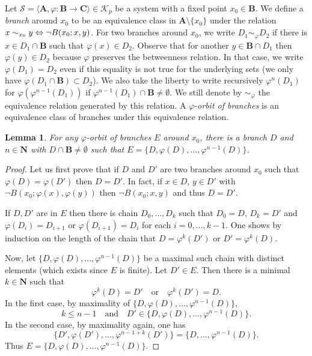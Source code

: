 \documentclass[JEP,XML,SOM,Unicode,NoFloatCountersInSection]{cedram}
\newcommand\ssi{\mathchoice{\iff}{\Leftrightarrow}{\Leftrightarrow}{\Leftrightarrow}}
\let\mathcal\mathscr
\theoremstyle{plain}
\newtheorem{lem}[thm]{Lemma}
\theoremstyle{definition}
\newcommand{\bA}{{\boldsymbol{A}}}
\newcommand{\bB}{{\boldsymbol{B}}}
\newcommand{\bC}{{\boldsymbol{C}}}
\newcommand{\NN}{\mathbf{N}}
\newcommand{\cK}{\mathcal{K}}
\newcommand{\cS}{\mathcal{S}}
\begin{document}
Let $\cS=\langle \bA,\varphi\colon\bB\to\bC\rangle\in\cK_p$ be a system with a fixed point $x_0\in\bB$. We define a \emph{branch} around $x_0$ to be an equivalence class in $\bA\setminus\{x_0\}$ under the relation $x\sim_{x_0} y \ssi \neg B(x_0;x,y)$.
For two branches around $x_0$, we write $D_1\sim_\varphi D_2$ if there is $x\in D_1\cap \bB$ such that $\varphi(x)\in D_2$. Observe that for another $y\in \bB\cap D_1$ then $\varphi(y)\in D_2$ because $\varphi$ preserves the betweenness relation. In that case, we write $\varphi(D_1)=D_2$ even if this equality is not true for the underlying sets (we only have $\varphi(D_1\cap \bB)\subset D_2$). We also take the liberty to write recursively $\varphi^n(D_1)$ for $\varphi(\varphi^{n-1}(D_1))$ if $\varphi^{n-1}{(D_1)}\cap \bB\neq\emptyset$. We still denote by $\sim_\varphi$ the equivalence relation generated by this relation. A $\varphi$-\emph{orbit of branches} is an equivalence class of branches under this equivalence relation.

\begin{lem}\label{phi-orbit} For any $\varphi$-orbit of branches $E$ around $x_0$, there is a branch $D$ and $n\in\NN$ with $D\cap \bB\neq\emptyset$ such that $E=\{D,\varphi(D),\dots,\varphi^{n-1}(D)\}$.
\end{lem}
\begin{proof} Let us first prove that if $D$ and $D'$ are two branches around $x_0$ such that $\varphi(D)=\varphi(D')$ then $D=D'$. In fact, if $x\in D$, $y\in D'$ with $\neg B(x_0;\varphi(x),\varphi(y))$ then $\neg B(x_0;x,y)$ and thus $D=D'$.

If $D,D'$ are in $E$ then there is chain $D_0,\dots,D_k$ such that $D_0=D$, $D_k=D'$ and $\varphi(D_i)=D_{i+1}$ or $\varphi(D_{i+1})=D_i$ for each $i=0,\dots,k-1$. One shows by induction on the length of the chain that $D=\varphi^k(D')$ or $D'=\varphi^k(D)$.

Now, let $\{D,\varphi(D),\dots,\varphi^{n-1}(D)\}$ be a maximal such chain with distinct elements (which exists since $E$ is finite). Let $D'\in E$. Then there is a minimal $k\in\NN$ such that
\[
\varphi^k(D)=D'\quad\text{or}\quad \varphi^k(D')=D.
\]
In the first case, by maximality of $\{D,\varphi(D),\dots,\varphi^{n-1}(D)\}$,
\[
k\leq n-1\quad\text{and}\quad D'\in\{D,\varphi(D),\dots,\varphi^{n-1}(D)\}.
\]
In the second case, by maximality again, one has
\[
\{D',\varphi(D'),\dots,\varphi^{n-1+k}(D')\}=\{D,\dots,\varphi^{n-1}(D)\}.
\]
Thus $E=\{D,\varphi(D),\dots,\varphi^{n-1}(D)\}$.
\end{proof}
\end{document}
